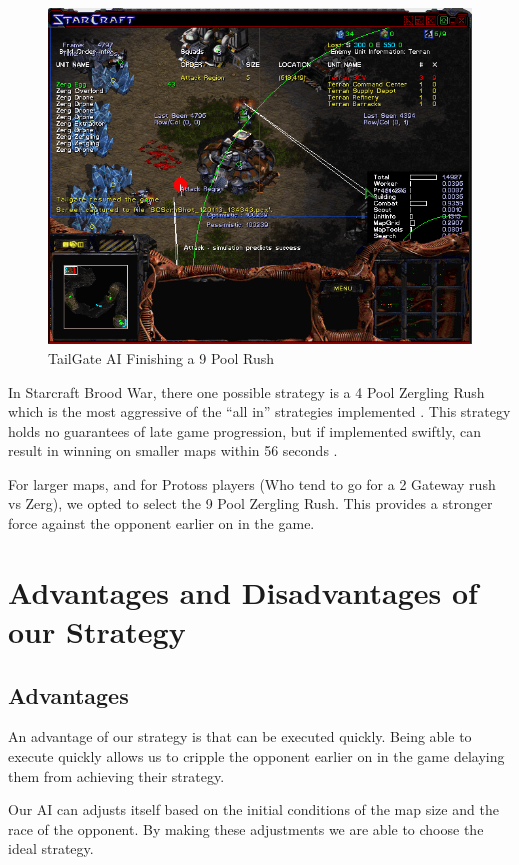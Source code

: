 \documentclass{article}
\begin{document}
\begin{figure}[!ht]
    \centering
	\includegraphics[width=\textwidth]{images/tailgate_ai.png}
	\caption{TailGate AI Finishing a 9 Pool Rush \cite{9poolvprotoss}}
	\label{fig:9poolrush}
\end{figure}

In Starcraft Brood War, there one possible strategy is a 4 Pool Zergling Rush which is the most aggressive of the ``all in'' strategies implemented \cite{4poolrush}. This strategy holds no guarantees of late game progression, but if implemented swiftly, can result in winning on smaller maps within 56 seconds \cite{9poolvprotoss}.

For larger maps, and for Protoss players (Who tend to go for a 2 Gateway rush vs Zerg), we opted to select the 9 Pool Zergling Rush. This provides a stronger force against the opponent earlier on in the game.

\section{Advantages and Disadvantages of our Strategy}

\subsection{Advantages}
An advantage of our strategy is that can be executed quickly. Being able to execute quickly allows us to cripple the opponent earlier on in the game delaying them from achieving their strategy.

Our AI can adjusts itself based on the initial conditions of the map size and the race of the opponent. By making these adjustments we are able to choose the ideal strategy.
\end{document}
